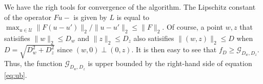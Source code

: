 We have the righ tools for convergence of the algorithm. The Lipschitz constant 
of the operator $F  u - $ is given by $L$ is equal to $\max_{
u \in \mathcal{U}} \lVert  F ( u -  u') \rVert_2 / \lVert  u -
 u' \rVert_2 \leq \lVert  F \rVert_2$. Of course, a point $ w, 
z$ that satisifies $\lVert  w \rVert_2 \leq D_{ w}$ and $\lVert  z
\rVert_2 \leq D_{ z}$ also satisifies $\lVert ( w,  z) \rVert_2 \leq
D$ when $D = \sqrt{D_{ w}^2 + D_{ z}^2}$ since $( w, 0) \perp (0,
 z)$. It is then easy to see that $f_D \geq \mathcal{G}_{D_{ w}, D_{
z}}$. Thus, the function $\mathcal{G}_{D_{ w}, D_{ z}}$ is upper bounded
by the right-hand side of equation \ref{eq:ub}.

